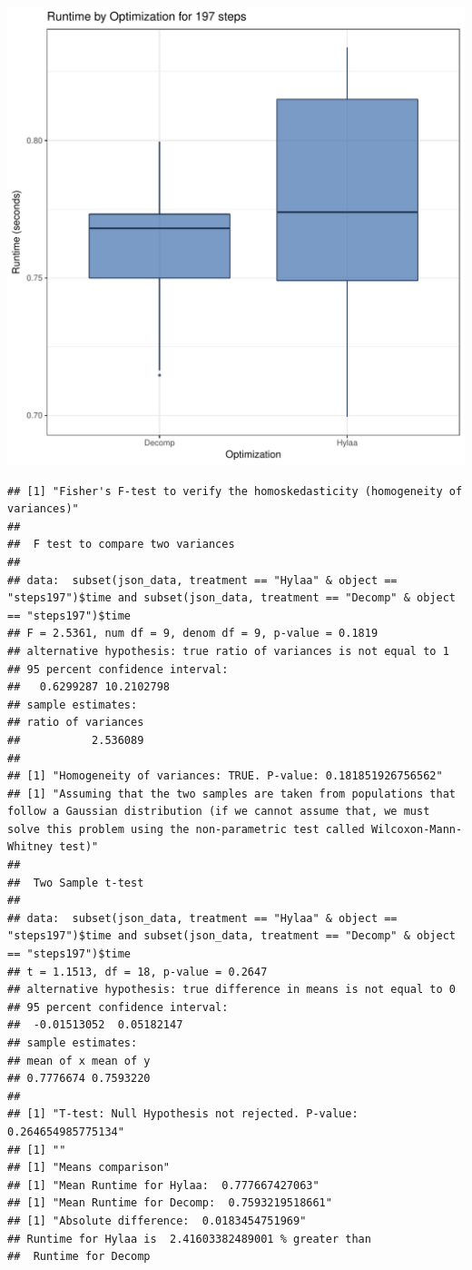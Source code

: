 \documentclass{article}\usepackage[]{graphicx}\usepackage[]{color}
\makeatletter
\def\maxwidth{ %
  \ifdim\Gin@nat@width>\linewidth
    \linewidth
  \else
    \Gin@nat@width
  \fi
}
\newenvironment{kframe}{%
 \def\at@end@of@kframe{}%
 \ifinner\ifhmode%
  \def\at@end@of@kframe{\end{minipage}}%
  \begin{minipage}{\columnwidth}%
 \fi\fi%
 \def\FrameCommand##1{\hskip\@totalleftmargin \hskip-\fboxsep
 \colorbox{shadecolor}{##1}\hskip-\fboxsep
     \hskip-\linewidth \hskip-\@totalleftmargin \hskip\columnwidth}%
 \MakeFramed {\advance\hsize-\width
   \@totalleftmargin\z@ \linewidth\hsize
   \@setminipage}}%
 {\par\unskip\endMakeFramed%
 \at@end@of@kframe}
\newenvironment{knitrout}{}{} %
\makeatother
\begin{document}
\begin{knitrout}
\color{fgcolor}
\includegraphics[width=\maxwidth]{figure/RH2_steps197-1} 
\begin{kframe}\begin{verbatim}
## [1] "Fisher's F-test to verify the homoskedasticity (homogeneity of variances)"
## 
## 	F test to compare two variances
## 
## data:  subset(json_data, treatment == "Hylaa" & object == "steps197")$time and subset(json_data, treatment == "Decomp" & object == "steps197")$time
## F = 2.5361, num df = 9, denom df = 9, p-value = 0.1819
## alternative hypothesis: true ratio of variances is not equal to 1
## 95 percent confidence interval:
##   0.6299287 10.2102798
## sample estimates:
## ratio of variances 
##           2.536089 
## 
## [1] "Homogeneity of variances: TRUE. P-value: 0.181851926756562"
## [1] "Assuming that the two samples are taken from populations that follow a Gaussian distribution (if we cannot assume that, we must solve this problem using the non-parametric test called Wilcoxon-Mann-Whitney test)"
## 
## 	Two Sample t-test
## 
## data:  subset(json_data, treatment == "Hylaa" & object == "steps197")$time and subset(json_data, treatment == "Decomp" & object == "steps197")$time
## t = 1.1513, df = 18, p-value = 0.2647
## alternative hypothesis: true difference in means is not equal to 0
## 95 percent confidence interval:
##  -0.01513052  0.05182147
## sample estimates:
## mean of x mean of y 
## 0.7776674 0.7593220 
## 
## [1] "T-test: Null Hypothesis not rejected. P-value: 0.264654985775134"
## [1] ""
## [1] "Means comparison"
## [1] "Mean Runtime for Hylaa:  0.777667427063"
## [1] "Mean Runtime for Decomp:  0.7593219518661"
## [1] "Absolute difference:  0.0183454751969"
## Runtime for Hylaa is  2.41603382489001 % greater than 
##  Runtime for Decomp
\end{verbatim}
\end{kframe}
\end{knitrout}
\end{document}
